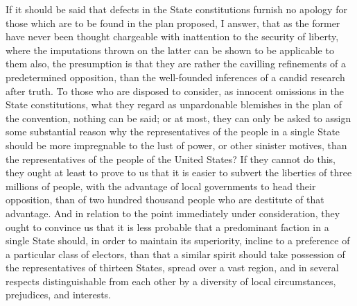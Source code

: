 If it should be said that defects in the State constitutions furnish no apology for those which are to be found in the plan proposed, I answer, that as the former have never been thought chargeable with inattention to the security of liberty, where the imputations thrown on the latter can be shown to be applicable to them also, the presumption is that they are rather the cavilling refinements of a predetermined opposition, than the well-founded inferences of a candid research after truth. To those who are disposed to consider, as innocent omissions in the State constitutions, what they regard as unpardonable blemishes in the plan of the convention, nothing can be said; or at most, they can only be asked to assign some substantial reason why the representatives of the people in a single State should be more impregnable to the lust of power, or other sinister motives, than the representatives of the people of the United States? If they cannot do this, they ought at least to prove to us that it is easier to subvert the liberties of three millions of people, with the advantage of local governments to head their opposition, than of two hundred thousand people who are destitute of that advantage. And in relation to the point immediately under consideration, they ought to convince us that it is less probable that a predominant faction in a single State should, in order to maintain its superiority, incline to a preference of a particular class of electors, than that a similar spirit should take possession of the representatives of thirteen States, spread over a vast region, and in several respects distinguishable from each other by a diversity of local circumstances, prejudices, and interests.

